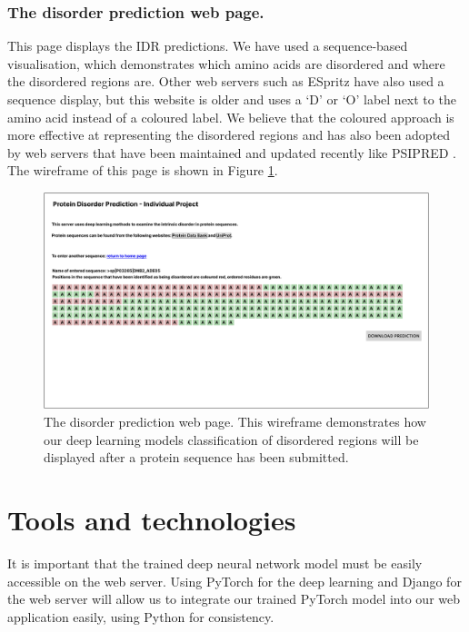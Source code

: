 \documentclass{l4proj}
\begin{document}
\subsubsection{The disorder prediction web page.}

This page displays the IDR predictions. We have used a sequence-based visualisation, which demonstrates which amino acids are disordered and where the disordered regions are. Other web servers such as ESpritz \citep{Walsh:11} have also used a sequence display, but this website is older and uses a ‘D’ or ‘O’ label next to the amino acid instead of a coloured label. We believe that the coloured approach is more effective at representing the disordered regions and has also been adopted by web servers that have been maintained and updated recently like PSIPRED \citep{Jones:19}. The wireframe of this page is shown in Figure \ref{fig:wireframe2}.

\begin{figure}[!htb]
    \centering
    \includegraphics[width=0.90\linewidth]{images/Index-disorderprediction.pdf}
    
    \caption{The disorder prediction web page. This wireframe demonstrates how our deep learning models classification of disordered regions will be displayed after a protein sequence has been submitted.}
    
    \label{fig:wireframe2} 
\end{figure}

\section{Tools and technologies}
It is important that the trained deep neural network model must be easily accessible on the web server. Using PyTorch for the deep learning and Django for the web server will allow us to integrate our trained PyTorch model into our web application easily, using Python for consistency.
\end{document}
